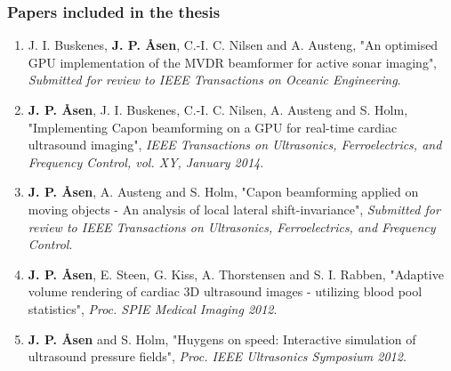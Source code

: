 \subsubsection{Papers included in the thesis}
\begin{enumerate}
	\item J. I. Buskenes, \textbf{J. P. \AA{}sen}, C.-I. C. Nilsen and A. Austeng, "An optimised GPU implementation of the MVDR beamformer for active sonar imaging", {\it Submitted for review to IEEE Transactions on Oceanic Engineering}.
	\item \textbf{J. P. \AA{}sen}, J. I. Buskenes, C.-I. C. Nilsen, A. Austeng and S. Holm, "Implementing Capon beamforming on a GPU for real-time cardiac ultrasound imaging", {\it IEEE Transactions on Ultrasonics, Ferroelectrics, and Frequency Control, vol. XY, January 2014}.
 	\item \textbf{J. P. \AA{}sen}, A. Austeng and S. Holm, "Capon beamforming applied on moving objects - An analysis of local lateral shift-invariance", {\it Submitted for review to IEEE Transactions on Ultrasonics, Ferroelectrics, and Frequency Control}.
	\item \textbf{J. P. \AA{}sen}, E. Steen, G. Kiss, A. Thorstensen and S. I. Rabben, "Adaptive volume rendering of cardiac 3D ultrasound images - utilizing blood pool statistics", {\it Proc. SPIE Medical Imaging 2012}.
	\item \textbf{J. P. \AA{}sen} and S. Holm, "Huygens on speed: Interactive simulation of ultrasound pressure fields", {\it Proc. IEEE Ultrasonics Symposium 2012}.
\end{enumerate}  

